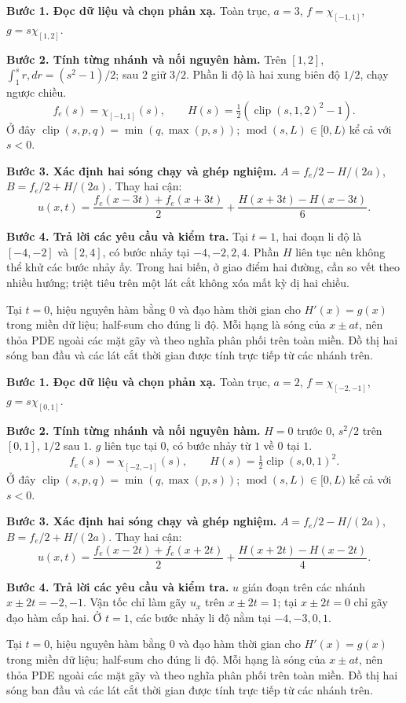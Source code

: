 \textbf{Bước 1. Đọc dữ liệu và chọn phản xạ.} Toàn trục, $a=3$, $f=\chi_{[-1,1]}$, $g=s\chi_{[1,2]}$.

\textbf{Bước 2. Tính từng nhánh và nối nguyên hàm.} Trên $[1,2]$, $\int_1^s r,dr=(s^2-1)/2$; sau $2$ giữ $3/2$. Phần li độ là hai xung biên độ $1/2$, chạy ngược chiều.
\[f_e(s)=\chi_{[-1,1]}(s),\qquad H(s)=\tfrac12(\operatorname{clip}(s,1,2)^2-1).\]
Ở đây $\operatorname{clip}(s,p,q)=\min(q,\max(p,s))$; $\operatorname{mod}(s,L)\in[0,L)$ kể cả với $s<0$.

\textbf{Bước 3. Xác định hai sóng chạy và ghép nghiệm.} $A=f_e/2-H/(2a)$, $B=f_e/2+H/(2a)$. Thay hai cận:
\[u(x,t)=\frac{f_e(x-3t)+f_e(x+3t)}2+\frac{H(x+3t)-H(x-3t)}{6}.\]

\textbf{Bước 4. Trả lời các yêu cầu và kiểm tra.} Tại $t=1$, hai đoạn li độ là $[-4,-2]$ và $[2,4]$, có bước nhảy tại $-4,-2,2,4$. Phần $H$ liên tục nên không thể khử các bước nhảy ấy. Trong hai biến, ở giao điểm hai đường, cần so vết theo nhiều hướng; triệt tiêu trên một lát cắt không xóa mất kỳ dị hai chiều.

Tại $t=0$, hiệu nguyên hàm bằng $0$ và đạo hàm thời gian cho $H'(x)=g(x)$ trong miền dữ liệu; half-sum cho đúng li độ. Mỗi hạng là sóng của $x\pm at$, nên thỏa PDE ngoài các mặt gãy và theo nghĩa phân phối trên toàn miền. Đồ thị hai sóng ban đầu và các lát cắt thời gian được tính trực tiếp từ các nhánh trên.

\textbf{Bước 1. Đọc dữ liệu và chọn phản xạ.} Toàn trục, $a=2$, $f=\chi_{[-2,-1]}$, $g=s\chi_{[0,1]}$.

\textbf{Bước 2. Tính từng nhánh và nối nguyên hàm.} $H=0$ trước $0$, $s^2/2$ trên $[0,1]$, $1/2$ sau $1$. $g$ liên tục tại $0$, có bước nhảy từ $1$ về $0$ tại $1$.
\[f_e(s)=\chi_{[-2,-1]}(s),\qquad H(s)=\tfrac12\operatorname{clip}(s,0,1)^2.\]
Ở đây $\operatorname{clip}(s,p,q)=\min(q,\max(p,s))$; $\operatorname{mod}(s,L)\in[0,L)$ kể cả với $s<0$.

\textbf{Bước 3. Xác định hai sóng chạy và ghép nghiệm.} $A=f_e/2-H/(2a)$, $B=f_e/2+H/(2a)$. Thay hai cận:
\[u(x,t)=\frac{f_e(x-2t)+f_e(x+2t)}2+\frac{H(x+2t)-H(x-2t)}{4}.\]

\textbf{Bước 4. Trả lời các yêu cầu và kiểm tra.} $u$ gián đoạn trên các nhánh $x\pm2t=-2,-1$. Vận tốc chỉ làm gãy $u_x$ trên $x\pm2t=1$; tại $x\pm2t=0$ chỉ gãy đạo hàm cấp hai. Ở $t=1$, các bước nhảy li độ nằm tại $-4,-3,0,1$.

Tại $t=0$, hiệu nguyên hàm bằng $0$ và đạo hàm thời gian cho $H'(x)=g(x)$ trong miền dữ liệu; half-sum cho đúng li độ. Mỗi hạng là sóng của $x\pm at$, nên thỏa PDE ngoài các mặt gãy và theo nghĩa phân phối trên toàn miền. Đồ thị hai sóng ban đầu và các lát cắt thời gian được tính trực tiếp từ các nhánh trên.

